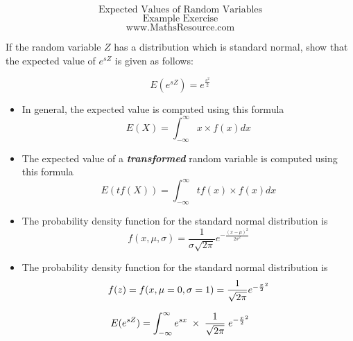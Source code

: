 \documentclass[12pt]{report}
\begin{document}
	
	
	
	\bigskip
	{
		\huge
		\[ \mbox{Expected Values of Random Variables}\]
		\Large
		\[ \mbox{Example Exercise}\]
		\bigskip
		\Large
		\[ \mbox{www.MathsResource.com}\]
	}
	
	
	
	\Large
	If the random variable $Z$ has a distribution which is standard normal, show that the expected value of $e^{sZ}$ is given as follows:
	
	{
		\LARGE
		\[E(e^{sZ})  =  e^{\frac{s^2}{2}}\] 
	}
	
	
	
	
	
	\Large
	\begin{itemize}
		\item In general, the expected value is computed using this formula
		{
			\LARGE
			\[ E(X) =  \int_{-\infty}^{\infty}  x \times f(x) dx   \]
		}
		\item The expected value of a \textbf{\textit{transformed}} random variable is computed using this formula
		{
			\LARGE
			\[ E( tf(X) ) =  \int_{-\infty}^{\infty}  tf(x) \times f(x) dx   \]
		}
	\end{itemize}
	
	
	
	
	\Large
	\begin{itemize}
		\item 
		The probability density function for the standard normal distribution is
		{
			\Large
			\[f(x, \mu, \sigma) = \frac{1}{\sigma\sqrt{2\pi}} e^{ -\frac{(x-\mu)^2}{2\sigma^2} }\]}
		\item 
		The probability density function for the standard normal distribution is
		{
			\Large
			\[f(z) = f(x, \mu= 0, \sigma=1) = \frac{1}{\sqrt{2\pi}} e^{ -{x \over 2}^2 }\]
		}
	\end{itemize}
	
	
	\Large
	
	
	
	{
		\LARGE
		\[ E( e^{sZ} ) =  \int_{-\infty}^{\infty}  e^{sx} \;\times\; \frac{1}{\sqrt{2\pi}} \;e^{ -{x \over 2}^2 }\]
	}
	
\end{document}
